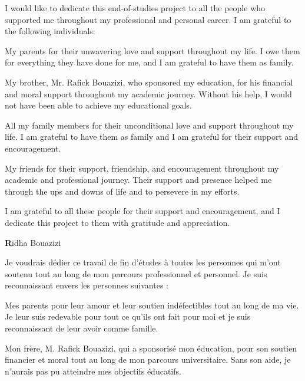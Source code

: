 \thispagestyle{empty}
\thispagestyle{empty}
\begin{center}
\end{center}
\vspace{0.8cm}

I would like to dedicate this end-of-studies project to all the people who supported me throughout my professional and personal career. I am grateful to the following individuals: 

My parents for their unwavering love and support throughout my life. I owe them for everything they have done for me, and I am grateful to have them as family. 

My brother, Mr. Rafick Bouazizi, who sponsored my education, for his financial and moral support throughout my academic journey. Without his help, I would not have been able to achieve my educational goals. 

All my family members for their unconditional love and support throughout my life. I am grateful to have them as family and I am grateful for their support and encouragement. 

My friends for their support, friendship, and encouragement throughout my academic and professional journey. Their support and presence helped me through the ups and downs of life and to persevere in my efforts. 

I am grateful to all these people for their support and encouragement, and I dedicate this project to them with gratitude and appreciation.
\begin{flushright}
\textbf Ridha Bouazizi
\end{flushright}

\newpage
\thispagestyle{empty}
\begin{center}
\end{center}
\vspace{0.8cm}

Je voudrais dédier ce travail de fin d'études à toutes les personnes qui m'ont soutenu tout au long de mon parcours professionnel et personnel. Je suis reconnaissant envers les personnes suivantes : 

Mes parents pour leur amour et leur soutien indéfectibles tout au long de ma vie. Je leur suis redevable pour tout ce qu'ils ont fait pour moi et je suis reconnaissant de leur avoir comme famille. 

Mon frère, M. Rafick Bouazizi, qui a sponsorisé mon éducation, pour son soutien financier et moral tout au long de mon parcours universitaire. Sans son aide, je n'aurais pas pu atteindre mes objectifs éducatifs. 

